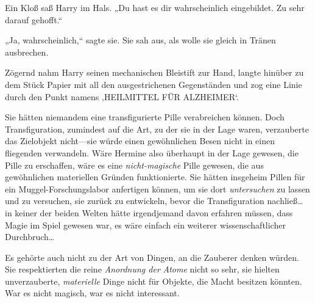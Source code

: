 Ein Kloß saß Harry im Hals. „Du hast es dir wahrscheinlich eingebildet. Zu sehr darauf gehofft.“

„Ja, wahrscheinlich,“ sagte sie. Sie sah aus, als wolle sie gleich in Tränen ausbrechen.

Zögernd nahm Harry seinen mechanischen Bleistift zur Hand, langte hinüber zu dem Stück Papier mit all den ausgestrichenen Gegenständen und zog eine Linie durch den Punkt namens ‚HEILMITTEL FÜR ALZHEIMER‘.

Sie hätten niemandem eine transfigurierte Pille verabreichen können. Doch Transfiguration, zumindest auf die Art, zu der sie in der Lage waren, verzauberte das Zielobjekt nicht—sie würde einen gewöhnlichen Besen nicht in einen fliegenden verwandeln. Wäre Hermine also überhaupt in der Lage gewesen, die Pille zu erschaffen, wäre es eine \emph{nicht-magische} Pille gewesen, die aus gewöhnlichen materiellen Gründen funktionierte. Sie hätten insgeheim Pillen für ein Muggel-Forschungslabor anfertigen können, um sie dort \emph{untersuchen} zu lassen und zu versuchen, sie zurück zu entwickeln, bevor die Transfiguration nachließ… in keiner der beiden Welten hätte irgendjemand davon erfahren müssen, dass Magie im Spiel gewesen war, es wäre einfach ein weiterer wissenschaftlicher Durchbruch…

Es gehörte auch nicht zu der Art von Dingen, an die Zauberer denken würden. Sie respektierten die reine \emph{Anordnung der} \emph{Atome} nicht so sehr, sie hielten unverzauberte, \emph{materielle} Dinge nicht für Objekte, die Macht besitzen könnten. War es nicht magisch, war es nicht interessant.

